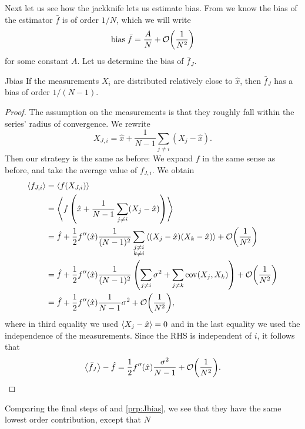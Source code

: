 Next let us see how the jackknife lets us estimate bias.
From  we know the bias of the estimator $\bar{f}$ 
is of order $1/N$, which we will write
\begin{equation}\label{eq:bias}
  \text{bias}\;\bar{f}=\frac{A}{N}+\order{\frac{1}{N^2}}
\end{equation}
for some constant $A$. Let us determine the bias of $\bar{f}_J$.
\begin{proposition}{}{Jbias}
  If the measurements $X_i$ are distributed relatively close to $\hat{x}$, 
  then $\bar{f}_J$ has a bias of order $1/(N-1)$.
  \begin{proof}
    The assumption on the measurements is that they roughly fall within
    the series' radius of convergence. We rewrite
    $$
      X_{J,i}=\hat{x}+\frac{1}{N-1}\sum_{j\neq i}(X_j-\hat{x}).
    $$
    Then our strategy is the same as before: We expand $f$ in the same
    sense as before, and take the average value of $f_{J,i}$.
    We obtain
    \begin{equation*}
      \begin{aligned}
        \ev{f_{J,i}}&=\ev{f(X_{J,i})}\\
          &=\ev{f\left(\hat{x}
            +\frac{1}{N-1}\sum_{j\neq i}(X_j-\hat{x})\right)}\\
          &=\hat{f}+\frac{1}{2}f''(\hat{x})\frac{1}{(N-1)^2}
             \sum_{\substack{j\neq i\\k\neq i}}
              \ev{(X_j-\hat{x})(X_k-\hat{x})}
             +\order{\frac{1}{N^2}}\\
          &=\hat{f}+\frac{1}{2}f''(\hat{x})\frac{1}{(N-1)^2}\left(
             \sum_{j\neq i}\sigma^2+\sum_{j\neq k}\Cov(X_j,X_k)\right)
             +\order{\frac{1}{N^2}}\\
          &=\hat{f}+\frac{1}{2}f''(\hat{x})\frac{1}{N-1}\sigma^2
             +\order{\frac{1}{N^2}},
      \end{aligned}
    \end{equation*}
    where in third equality we used $\ev{X_j-\hat{x}}=0$ and in the
    last equality we used the independence of the measurements. Since
    the RHS is independent of $i$, it follows that
    $$
      \ev{\bar{f}_J}-\hat{f}=\frac{1}{2}f''(\hat{x})\frac{\sigma^2}{N-1}
       +\order{\frac{1}{N^2}}.
    $$
  \end{proof}
\end{proposition}
Comparing the final steps of  and \ref{prp:Jbias},
we see that they have the same lowest order contribution, except that $N$
